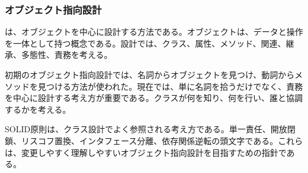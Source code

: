 \subsubsection{オブジェクト指向設計}

 は、オブジェクトを中心に設計する方法である。オブジェクトは、データと操作を一体として持つ概念である。設計では、クラス、属性、メソッド、関連、継承、多態性、責務を考える。

初期のオブジェクト指向設計では、名詞からオブジェクトを見つけ、動詞からメソッドを見つける方法が使われた。現在では、単に名詞を拾うだけでなく、責務を中心に設計する考え方が重要である。クラスが何を知り、何を行い、誰と協調するかを考える。

SOLID原則は、クラス設計でよく参照される考え方である。単一責任、開放閉鎖、リスコフ置換、インタフェース分離、依存関係逆転の頭文字である。これらは、変更しやすく理解しやすいオブジェクト指向設計を目指すための指針である。
